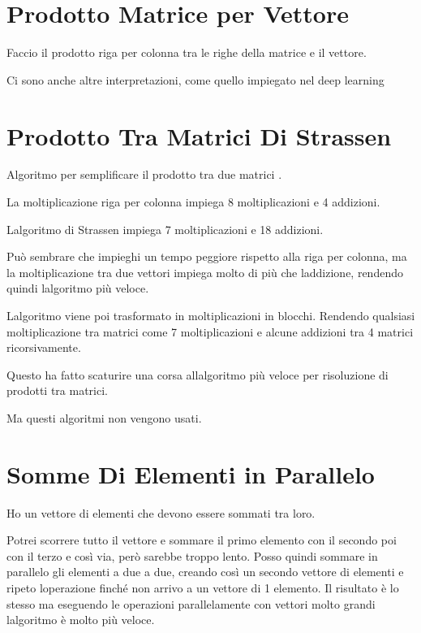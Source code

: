 \documentclass[
]{article}
\begin{document}
\hypertarget{prodotto-matrice-per-vettore}{%
\section{Prodotto Matrice per
Vettore}\label{prodotto-matrice-per-vettore}}

{}{}{}{}

Faccio il prodotto riga per colonna tra le righe della matrice e il
vettore.

Ci sono anche altre interpretazioni, come quello impiegato nel deep
learning

\hypertarget{prodotto-tra-matrici-di-strassen}{%
\section{Prodotto Tra Matrici Di
Strassen}\label{prodotto-tra-matrici-di-strassen}}

Algoritmo per semplificare il prodotto tra due matrici {}.

La moltiplicazione riga per colonna impiega 8 moltiplicazioni e 4
addizioni.

L\textquotesingle algoritmo di Strassen impiega 7 moltiplicazioni e 18
addizioni.

Può sembrare che impieghi un tempo peggiore rispetto alla riga per
colonna, ma la moltiplicazione tra due vettori impiega molto di più che
l\textquotesingle addizione, rendendo quindi l\textquotesingle algoritmo
più veloce.

L\textquotesingle algoritmo viene poi trasformato in moltiplicazioni in
blocchi. Rendendo qualsiasi moltiplicazione tra matrici {} come 7
moltiplicazioni e alcune addizioni tra 4 matrici {} ricorsivamente.

Questo ha fatto scaturire una corsa all\textquotesingle algoritmo più
veloce per risoluzione di prodotti tra matrici.

Ma questi algoritmi non vengono usati.

\hypertarget{somme-di-elementi-in-parallelo}{%
\section{Somme Di Elementi in
Parallelo}\label{somme-di-elementi-in-parallelo}}

Ho un vettore di {} elementi che devono essere sommati tra loro.

Potrei scorrere tutto il vettore e sommare il primo elemento con il
secondo poi con il terzo e così via, però sarebbe troppo lento. Posso
quindi sommare in parallelo gli elementi a due a due, creando così un
secondo vettore di {} elementi e ripeto l\textquotesingle operazione
finché non arrivo a un vettore di 1 elemento. Il risultato è lo stesso
ma eseguendo le operazioni parallelamente con vettori molto grandi
l\textquotesingle algoritmo è molto più veloce.
\end{document}

